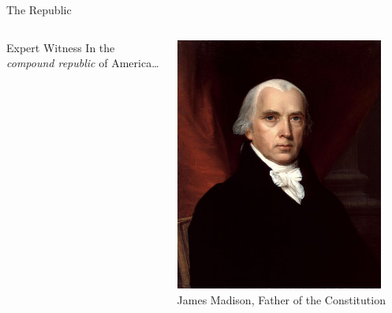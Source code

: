 \begin{frame}{The Republic}
    \begin{columns}[c]
            \begin{varblock}[0.8\textwidth]{Expert Witness}
                \Large{In the \emph{compound republic} of America\ldots}
            \end{varblock}
        \column{0.5\textheight}
            \centering
            \includegraphics[width=0.9\textwidth]{img/madison.jpg} \\
            James Madison, Father of the Constitution \\
    \end{columns}
\end{frame}

